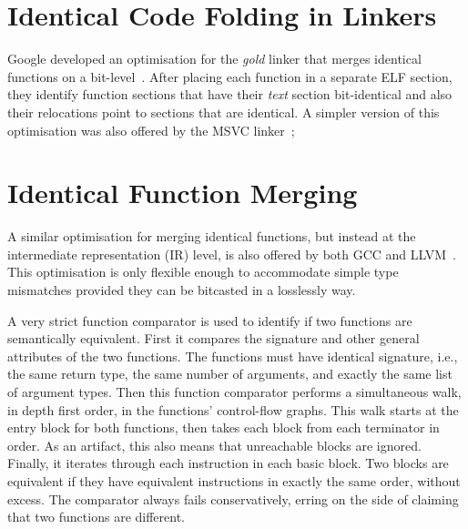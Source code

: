 
\section{Identical Code Folding in Linkers}

Google developed an optimisation for the \textit{gold} linker that merges
identical functions on a bit-level~\cite{tallam10,kwan12}.
After placing each function in a separate ELF section, they identify function
sections that have their \textit{text} section bit-identical and also their
relocations point to sections that are identical. A simpler version of this
optimisation was also offered by the MSVC linker~\cite{msvc-icf};

\section{Identical Function Merging}

A similar optimisation for merging identical functions, but instead at the
intermediate representation (IR) level, is also offered by both GCC and
LLVM~\cite{llvm-fm,livska14}.
This optimisation is only flexible enough to accommodate simple type mismatches
provided they can be bitcasted in a losslessly way.


A very strict function comparator is used to identify if two functions are 
semantically equivalent.
First it compares the signature and other general attributes of the two functions.
The functions must have identical signature, i.e., the same return type, the same
number of arguments, and exactly the same list of argument types.
Then this function comparator performs a simultaneous walk, in depth
first order, in the functions' control-flow graphs.
This walk starts at the entry block for both functions, then takes each block
from each terminator in order.
As an artifact, this also means that unreachable blocks are ignored.
Finally, it iterates through each instruction in each basic block.
Two blocks are equivalent if they have equivalent instructions in exactly the
same order, without excess.
The comparator always fails conservatively, erring on the side of claiming that
two functions are different.

